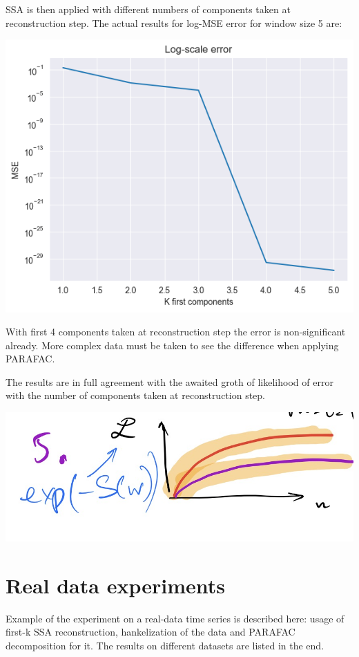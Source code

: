 \documentclass{article}
\begin{document}
SSA is then applied with different numbers of components taken at reconstruction step. The actual results for log-MSE error for window size 5 are:

\includegraphics[scale=0.7]{./images/fig2.png}

With first 4 components taken at reconstruction step the error is non-significant already. More complex data must be taken to see the difference when applying PARAFAC.

The results are in full agreement with the awaited groth of likelihood of error with the number of components taken at reconstruction step.

\includegraphics[scale=0.3]{./images/prelim.png}

\section{Real data experiments}

Example of the experiment on a real-data time series is described here: usage of first-k SSA reconstruction, hankelization of the data and PARAFAC decomposition for it. The results on different datasets are listed in the end.
\end{document}
